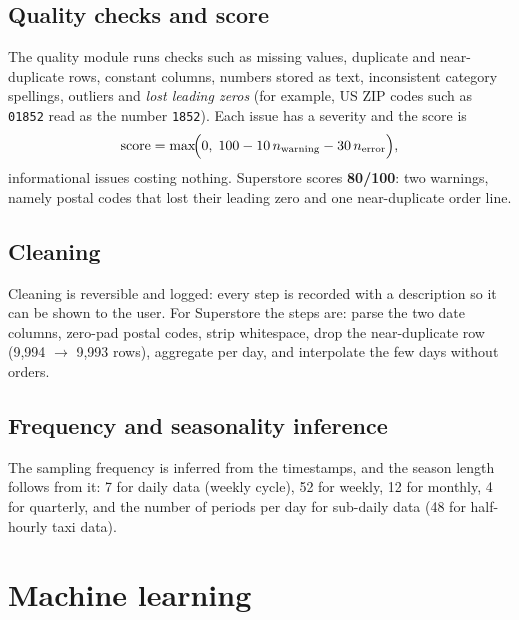 \documentclass[11pt,a4paper]{article}
\newcommand{\code}[1]{\texttt{#1}}
\begin{document}
\subsection{Quality checks and score}
The quality module runs checks such as missing values, duplicate and near-duplicate rows, constant columns,
numbers stored as text, inconsistent category spellings, outliers and \emph{lost leading zeros} (for example, US
ZIP codes such as \code{01852} read as the number \code{1852}). Each issue has a severity and the score is
\[
  \text{score} = \max\!\Bigl(0,\; 100 - 10\,n_{\text{warning}} - 30\,n_{\text{error}}\Bigr),
\]
informational issues costing nothing. Superstore scores \textbf{80/100}: two warnings, namely postal codes that lost
their leading zero and one near-duplicate order line.

\subsection{Cleaning}
Cleaning is reversible and logged: every step is recorded with a description so it can be shown to the user.
For Superstore the steps are: parse the two date columns, zero-pad postal codes, strip whitespace, drop the
near-duplicate row (9{,}994 $\to$ 9{,}993 rows), aggregate per day, and interpolate the few days without orders.

\subsection{Frequency and seasonality inference}
The sampling frequency is inferred from the timestamps, and the season length follows from it: 7 for daily data
(weekly cycle), 52 for weekly, 12 for monthly, 4 for quarterly, and the number of periods per day for sub-daily
data (48 for half-hourly taxi data).

\section{Machine learning}
\end{document}

